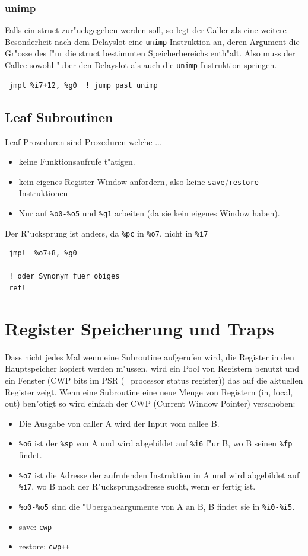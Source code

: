 \documentclass[german, 10pt, a4paper, twocolumn]{scrartcl}
\begin{document}
\subsubsection{unimp}

Falls ein struct zur"uckgegeben werden soll, so legt der Caller als eine weitere Besonderheit nach dem Delayslot eine \verb#unimp# Instruktion an, deren Argument die Gr"osse des f"ur die struct bestimmten Speicherbereichs enth"alt. Also muss der Callee sowohl "uber den Delayslot als auch die \verb#unimp# Instruktion springen.
\begin{verbatim}
 jmpl %i7+12, %g0  ! jump past unimp
\end{verbatim}

\subsection{Leaf Subroutinen}

Leaf-Prozeduren sind Prozeduren welche ...
\begin{itemize}
	\item keine Funktionsaufrufe t"atigen.
	\item kein eigenes Register Window anfordern, also keine \verb#save#/\verb#restore# Instruktionen
	\item Nur auf \verb#%o0-%o5# und \verb#%g1# arbeiten (da sie kein eigenes Window haben).
\end{itemize}

Der R"ucksprung ist anders, da \verb#%pc# in \verb#%o7#, nicht in \verb#%i7#
\begin{verbatim}
 jmpl  %o7+8, %g0
 
 ! oder Synonym fuer obiges
 retl
\end{verbatim}

\section{Register Speicherung und Traps}

Dass nicht jedes Mal wenn eine Subroutine aufgerufen wird, die Register in den Hauptspeicher kopiert werden m"ussen, wird ein Pool von Registern benutzt und ein Fenster (CWP bits im PSR (=processor status register)) das auf die aktuellen Register zeigt. Wenn eine Subroutine eine neue Menge von Registern (in, local, out) ben"otigt so wird einfach der CWP (Current Window Pointer) verschoben:
\begin{itemize}
	\item Die Ausgabe von caller A wird der Input vom callee B.
	\item \verb#%o6# ist der \verb#%sp# von A und wird abgebildet auf \verb#%i6# f"ur B, wo B seinen \verb#%fp# findet.
	\item \verb#%o7# ist die Adresse der aufrufenden Instruktion in A und wird abgebildet auf \verb#%i7#, wo B nach der R"ucksprungadresse sucht, wenn er fertig ist.
	\item \verb#%o0-%o5# sind die "Ubergabeargumente von A an B, B findet sie in \verb#%i0-%i5#.
	\item save: \verb#cwp--#
	\item restore: \verb#cwp++#
\end{itemize}
\end{document}
